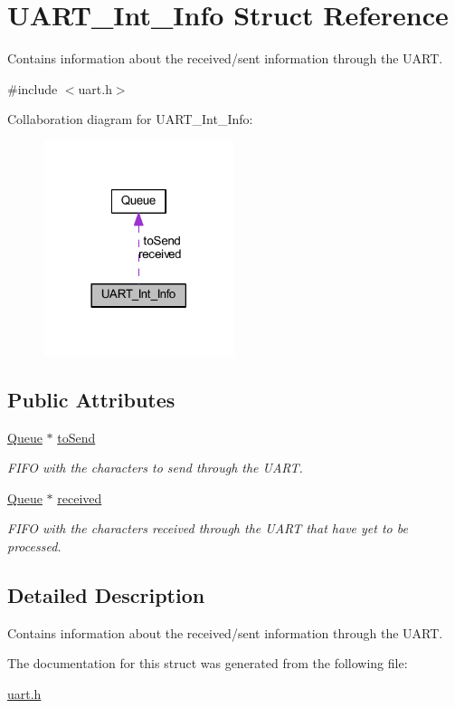 \hypertarget{struct_u_a_r_t___int___info}{}\section{U\+A\+R\+T\+\_\+\+Int\+\_\+\+Info Struct Reference}
\label{struct_u_a_r_t___int___info}


Contains information about the received/sent information through the U\+A\+RT.  




{\ttfamily \#include $<$uart.\+h$>$}



Collaboration diagram for U\+A\+R\+T\+\_\+\+Int\+\_\+\+Info\+:\nopagebreak
\begin{figure}[H]
\begin{center}
\leavevmode
\includegraphics[width=158pt]{struct_u_a_r_t___int___info__coll__graph}
\end{center}
\end{figure}
\subsection*{Public Attributes}
\begin{DoxyCompactItemize}
\item 
\mbox{\hyperlink{struct_queue}{Queue}} $\ast$ \mbox{\hyperlink{group__uart_ga47efde0ca206be4c7ae8123ae7aa7b8b}{to\+Send}}
\begin{DoxyCompactList}\small\item\em F\+I\+FO with the characters to send through the U\+A\+RT. \end{DoxyCompactList}\item 
\mbox{\hyperlink{struct_queue}{Queue}} $\ast$ \mbox{\hyperlink{group__uart_gaa2ce8acb1a0127464440fd3ca00cc283}{received}}
\begin{DoxyCompactList}\small\item\em F\+I\+FO with the characters received through the U\+A\+RT that have yet to be processed. \end{DoxyCompactList}\end{DoxyCompactItemize}


\subsection{Detailed Description}
Contains information about the received/sent information through the U\+A\+RT. 

The documentation for this struct was generated from the following file\+:\begin{DoxyCompactItemize}
\item 
\mbox{\hyperlink{uart_8h}{uart.\+h}}\end{DoxyCompactItemize}
